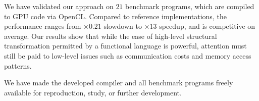 We have validated our approach on $21$ benchmark programs, which are
compiled to GPU code via OpenCL. Compared to reference
implementations, the performance ranges from $\times0.21$ slowdown to
$\times13$ speedup, and is competitive on average.
%
Our results show that while the ease of high-level structural
transformation permitted by a functional language is powerful,
attention must still be paid to low-level issues such as communication
costs and memory access patterns.

We have made the developed compiler and all benchmark programs freely
available for reproduction, study, or further development.

